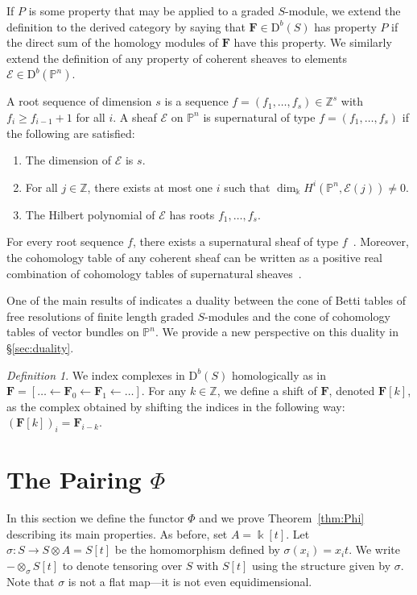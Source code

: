 \documentclass[12pt]{amsart}
\theoremstyle{definition}
\theoremstyle{remark}
\newtheorem{defn}[lemma]{Definition}
\newcommand{\kk}{\Bbbk}
\newcommand{\PP}{\mathbb{P}}
\newcommand{\ZZ}{\mathbb{Z}}
\newcommand{\cE}{\mathcal{E}}
\newcommand{\FF}{\mathbf{F}}
\newcommand{\defi}[1]{\textsf{#1}} %
\newcommand{\DD}{\mathrm{D}}
\begin{document}
If $P$ is some property that may be applied to a graded $S$-module, we extend the definition to the derived category by saying that $\FF \in \DD^b(S)$ has property $P$ if the direct sum of the homology modules of $\FF$ have this property. We similarly extend the definition of any property of coherent sheaves to elements $\cE\in \DD^b(\PP^n)$.  

A \defi{root sequence of dimension $s$} is a sequence $f=(f_1,\dots,f_s)\in \mathbb Z^{s}$ with $f_i\geq f_{i-1}+1$ for all $i$.  
A sheaf $\cE$ on $\PP^{n}$ is
\defi{supernatural of type} $f=(f_1, \dots, f_{s})$ if the following are satisfied: 
\begin{enumerate}
\item The dimension of $\cE$ is $s$.
\item For all $j\in \mathbb Z$, there exists at most one $i$ 
		such that $\dim_\Bbbk H^i(\PP^{n}, \cE(j))\ne 0$.
\item The Hilbert polynomial of $\cE$ has roots $f_1, \dots, f_{s}$.
\end{enumerate}
For every root sequence $f$, there exists a supernatural sheaf of type
$f$~\cite[Theorem~0.4]{eis-schrey1}.
Moreover, the cohomology table of any coherent sheaf 
can be written as a positive real combination of cohomology tables 
of supernatural sheaves~\cite[Theorem~0.1]{eis-schrey1}.  

One of the main results of \cite{eis-schrey1} indicates a duality between the cone of Betti tables of free resolutions of finite length graded $S$-modules and the cone of cohomology tables of vector bundles on $\PP^n$.  We provide a new perspective on this duality in \S\ref{sec:duality}. 


\begin{defn}
We index complexes in $\DD^b(S)$ homologically as in $\FF=[\dots \gets \FF_0\gets \FF_1\gets \dots]$.  For any $k\in \ZZ$, we define a \defi{shift} of $\FF$, denoted $\FF[k]$, as the complex obtained by shifting the indices in the following way:  $(\FF[k])_i=\FF_{i-k}$.
\end{defn}


\section{The Pairing $\Phi$}\label{sec:duality pairing}
In this section we define the functor $\Phi$ and we prove Theorem~\ref{thm:Phi} describing its main properties.  As before, set $A= \kk[t]$. Let 
$\sigma\colon S\to S\otimes A = S[t]$
be the homomorphism defined by $\sigma(x_{i})=x_{i}t$. 
We write $-\otimes_\sigma S[t]$ to denote tensoring over $S$ with $S[t]$ using the structure
given by $\sigma$. Note that $\sigma$ is not a flat map---it is not even equidimensional.
\end{document}
